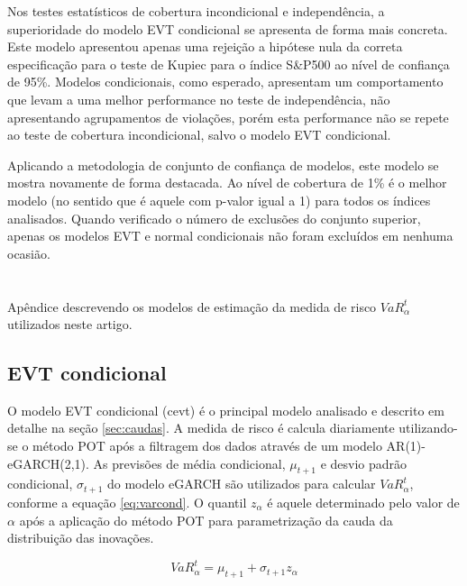 \documentclass[review]{elsarticle}
\theoremstyle{definition}
\begin{document}
Nos testes estatísticos de cobertura incondicional e independência, a superioridade do modelo EVT condicional se apresenta de forma mais concreta. Este modelo apresentou apenas uma rejeição a hipótese nula da correta especificação para o teste de Kupiec para o índice S\&P500 ao nível de confiança de 95\%. Modelos condicionais, como esperado, apresentam um comportamento que levam a uma melhor performance no teste de independência, não apresentando agrupamentos de violações, porém esta performance não se repete ao teste de cobertura incondicional, salvo o modelo EVT condicional.

Aplicando a metodologia de conjunto de confiança de modelos, este modelo se mostra novamente de forma destacada. Ao nível de cobertura de 1\% é o melhor modelo (no sentido que é aquele com p-valor igual a 1) para todos os índices analisados. Quando verificado o número de exclusões do conjunto superior, apenas os modelos EVT e normal condicionais não foram excluídos em nenhuma ocasião.


\appendix
\section{}
\label{apendice}

Apêndice descrevendo os modelos de estimação da medida de risco $VaR^t_\alpha$ utilizados neste artigo.

\subsection{EVT condicional}

O modelo EVT condicional (cevt) é o principal modelo analisado e descrito em detalhe na seção \ref{sec:caudas}. A medida de risco é calcula diariamente utilizando-se o método POT após a filtragem dos dados através de um modelo AR(1)-eGARCH(2,1). As previsões de média condicional, $\mu_{t+1}$ e desvio padrão condicional, $\sigma_{t+1}$ do modelo eGARCH são utilizados para calcular $VaR^t_\alpha$, conforme a equação \ref{eq:varcond}. O quantil $z_\alpha$ é aquele determinado pelo valor de $\alpha$ após a aplicação do método POT para parametrização da cauda da distribuição das inovações.

\begin{equation*}
VaR_\alpha^t=\mu_{t+1}+\sigma_{t+1}z_\alpha 
\end{equation*}
\end{document}

